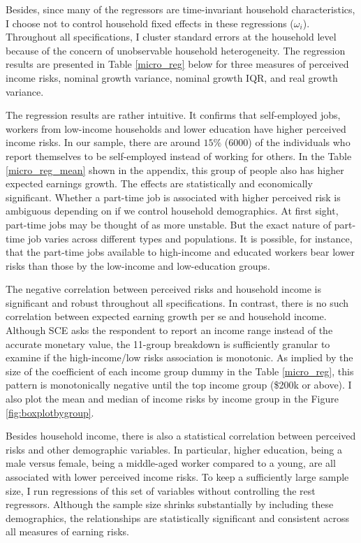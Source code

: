 \documentclass[12pt,notitlepage,onecolumn,aps,pra]{article}
\begin{document}
Besides, since many of the regressors are time-invariant household
characteristics, I choose not to control household fixed effects in
these regressions (\(\omega_i\)). Throughout all specifications, I
cluster standard errors at the household level because of the concern of
unobservable household heterogeneity. The regression results are
presented in Table \ref{micro_reg} below for three measures of perceived
income risks, nominal growth variance, nominal growth IQR, and real
growth variance.

The regression results are rather intuitive. It confirms that
self-employed jobs, workers from low-income households and lower
education have higher perceived income risks. In our sample, there are
around \(15\%\) (6000) of the individuals who report themselves to be
self-employed instead of working for others. In the Table
\ref{micro_reg_mean} shown in the appendix, this group of people also
has higher expected earnings growth. The effects are statistically and
economically significant. Whether a part-time job is associated with
higher perceived risk is ambiguous depending on if we control household
demographics. At first sight, part-time jobs may be thought of as more
unstable. But the exact nature of part-time job varies across different
types and populations. It is possible, for instance, that the part-time
jobs available to high-income and educated workers bear lower risks than
those by the low-income and low-education groups.

The negative correlation between perceived risks and household income is
significant and robust throughout all specifications. In contrast, there
is no such correlation between expected earning growth per se and
household income. Although SCE asks the respondent to report an income
range instead of the accurate monetary value, the 11-group breakdown is
sufficiently granular to examine if the high-income/low risks
association is monotonic. As implied by the size of the coefficient of
each income group dummy in the Table \ref{micro_reg}, this pattern is
monotonically negative until the top income group (\$200k or above). I
also plot the mean and median of income risks by income group in the
Figure \ref{fig:boxplotbygroup}.

Besides household income, there is also a statistical correlation
between perceived risks and other demographic variables. In particular,
higher education, being a male versus female, being a middle-aged worker
compared to a young, are all associated with lower perceived income
risks. To keep a sufficiently large sample size, I run regressions of
this set of variables without controlling the rest regressors. Although
the sample size shrinks substantially by including these demographics,
the relationships are statistically significant and consistent across
all measures of earning risks.
\end{document}

